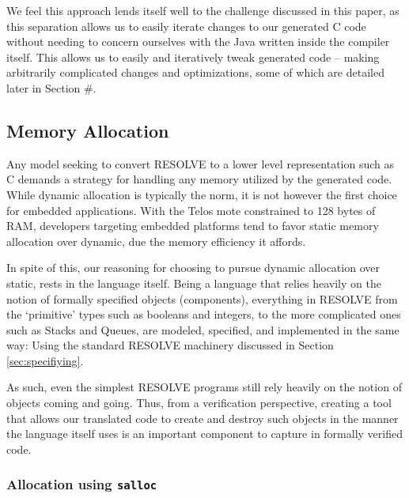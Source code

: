 We feel this approach lends itself well to the challenge discussed in this paper, as this separation allows us to easily iterate changes to our generated C code without needing to concern ourselves with the Java written inside the compiler itself. This allows us to easily and iteratively tweak generated code -- making arbitrarily complicated changes and optimizations, some of which are detailed later in Section \#.

\subsection{Memory Allocation}\label{sec:mem}

Any model seeking to convert RESOLVE to a lower level representation such as C demands a strategy for handling any memory utilized by the generated code. While dynamic allocation is typically the norm, it is not however the first choice for embedded applications. With the Telos mote constrained to 128 bytes of RAM, developers targeting embedded platforms tend to favor static memory allocation over dynamic, due the memory efficiency it affords. 


In spite of this, our reasoning for choosing to pursue dynamic allocation over static, rests in the language itself. Being a language that relies heavily on the notion of formally specified objects (components), everything in RESOLVE from the `primitive' types such as booleans and integers, to the more complicated ones such as Stacks and Queues, are modeled, specified, and implemented in the same way: Using the standard RESOLVE machinery discussed in Section \ref{sec:specifiying}. 

As such, even the simplest RESOLVE programs still rely heavily on the notion of objects coming and going. Thus, from a verification perspective, creating a tool that allows our translated code to create and destroy such objects in the manner the language itself uses is an important component to capture in formally verified code.

\subsubsection{Allocation using \texttt{salloc}}

